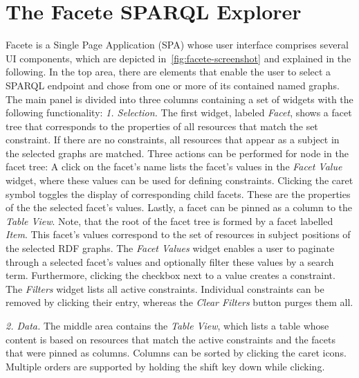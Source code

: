 \section{The Facete SPARQL Explorer}
\label{sec:facete}
Facete is a Single Page Application (SPA) whose user interface comprises several
UI components, which are depicted in~\autoref{fig:facete-screenshot} and
explained in the following.
In the top area, there are elements that enable the user
to select a SPARQL endpoint and chose from one or more of its contained named graphs.
The main panel is divided into three columns containing a set of widgets with
the following functionality:
\emph{1. Selection.}
The first widget, labeled \emph{Facet}, shows a
  facet tree that corresponds to the properties of all resources that match the
  set constraint.
  If there are no constraints, all resources that appear as a subject in the
  selected graphs are matched.
  Three actions can be performed for node in the facet tree:
  A click on the facet's name lists the facet's values in the
  \emph{Facet Value} widget, where these values can be used for defining
  constraints. Clicking the caret symbol toggles the display of
  corresponding child facets. These are the properties of the the selected facet's values.
  Lastly, a facet can be pinned as a column to the \emph{Table View}.
  Note, that the root of the facet tree is formed by a facet labelled
  \emph{Item}. This facet's values correspond to the set of resources in
  subject positions of the selected RDF graphs.
The \emph{Facet Values} widget enables a user to paginate
  through a selected facet's values and optionally filter these values by a
  search term. Furthermore, clicking the checkbox next to a value creates a
  constraint.
The \emph{Filters} widget lists all active constraints.
  Individual constraints can be removed by clicking their entry, whereas the  
  \emph{Clear Filters} button purges them all. 


\emph{2. Data.}
The middle area contains the \emph{Table View}, which
  lists a table whose content is based on resources that match the active constraints
  and the facets that were pinned as columns.
  Columns can be sorted by clicking the caret icons. Multiple orders are
  supported by holding the shift key down while clicking.

